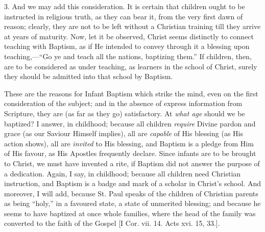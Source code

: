 3. And we may add this consideration. It is certain
that children ought to be instructed in religious truth,
as they can bear it, from the very first dawn of reason;
clearly, they are not to be left without a Christian
training till they arrive at years of maturity. Now, let it be observed, Christ seems distinctly to connect
teaching with Baptism, as if He intended to convey
through it a blessing upon teaching,—``Go ye and
teach all the nations, baptizing them.'' If children,
then, are to be considered as under teaching, as learners
in the school of Christ, surely they should be admitted
into that school by Baptism.

These are the reasons for Infant Baptism which strike
the mind, even on the first consideration of the subject;
and in the absence of express information from Scripture,
they are (as far as they go) satisfactory. At \emph{what
age} should we be baptized? I answer, in childhood;
because all children \emph{require} Divine pardon and
grace (as our Saviour Himself implies), all are \emph{capable}
of His blessing (as His action shows), all are \emph{invited}
to His blessing, and Baptism is a pledge from Him of His
favour, as His Apostles frequently declare. Since infants
are to be brought to Christ, we must have invented a
rite, if Baptism did not answer the purpose of a
dedication. Again, I say, in childhood; because all
children need Christian instruction, and Baptism is a
badge and mark of a scholar in Christ's school. And
moreover, I will add, because St. Paul speaks of the
children of Christian parents as being ``holy,''
in a favoured state, a state of unmerited blessing; and
because he seems to have baptized at once whole families,
where the head of the family was converted to the faith
of the Gospel [I Cor. vii. 14. Acts xvi. 15, 33.].

